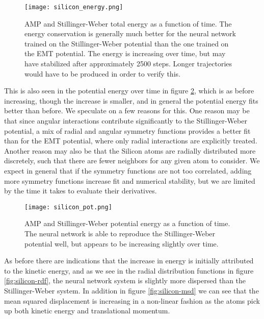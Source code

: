 \begin{figure}[H]
    \centering
    \texttt{[image: silicon\_energy.png]}
    \caption{AMP and Stillinger-Weber total energy as a function of time.
        The energy conservation is generally much better for the
        neural network trained on the Stillinger-Weber potential
        than the one trained on the EMT potential.
        The energy is increasing over time, but may have
        stabilized after approximately 2500 steps. Longer trajectories
        would have to be produced in order to verify this.}
    \label{fig:silicon-energy}
\end{figure}

This is also seen in the potential energy over time 
in figure \ref{fig:silicon-pot}, which is as before increasing,
though the increase is smaller, and in general the potential energy 
fits better than before.
We speculate on a few reasons for this.
One reason may be that since angular interactions contribute significantly to the
Stillinger-Weber potential, a mix of radial and angular symmetry functions
provides a better fit than for the EMT potential, where only radial interactions
are explicitly treated.
Another reason may also be that the Silicon atoms are radially distributed
more discretely, such that there are fewer neighbors for any given
atom to consider.
We expect in general that if the symmetry functions are not too correlated,
adding more symmetry functions increase fit and numerical stability, but
we are limited by the time it takes to evaluate their derivatives.

\begin{figure}[H]
    \centering
    \texttt{[image: silicon\_pot.png]}
    \caption{AMP and Stillinger-Weber potential energy as a function of time.
    The neural network is able to reproduce the Stillinger-Weber potential
    well, but appears to be increasing slightly over time.}
    \label{fig:silicon-pot}
\end{figure}

As before there are indications that the increase in energy 
is initially attributed to the kinetic energy,
and as we see in the radial distribution functions in figure 
\ref{fig:silicon-rdf}, the neural network
system is slightly more dispersed than the Stillinger-Weber system.
In addition in figure \ref{fig:silicon-msd} we can see that the mean squared
displacement is increasing in a non-linear fashion as the atoms pick up
both kinetic energy and translational momentum.

